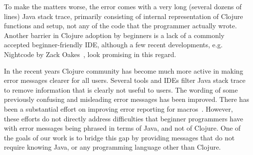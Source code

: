 \documentclass[submission,copyright,creativecommons]{eptcs}
\begin{document}
To make the matters worse, the error comes with a very long (several dozens of lines) Java stack trace, primarily consisting of internal 
representation of Clojure functions and setup, not any of the code that the programmer actually wrote. 
Another barrier in Clojure adoption by beginners is a lack of a commonly accepted beginner-friendly IDE, although
a few recent developments, e.g. Nightcode by Zack Oakes~\cite{nightcode},  look promising in this regard. 

In the recent years Clojure community has become much more active in making error messages clearer for all users. 
Several tools and IDEs filter Java stack trace to remove information that is clearly not useful to
users. The wording of some previously confusing and misleading error messages has been improved. 
There has been a substantial effort on improving error reporting for macros~\cite{fleming}. 
However, these efforts do not directly address difficulties that beginner programmers 
have with error messages being phrased in terms of Java, and not of Clojure. One of the 
goals of our work is to bridge this gap by providing messages that do not require knowing
Java, or any programming language other than Clojure. 
\end{document}
